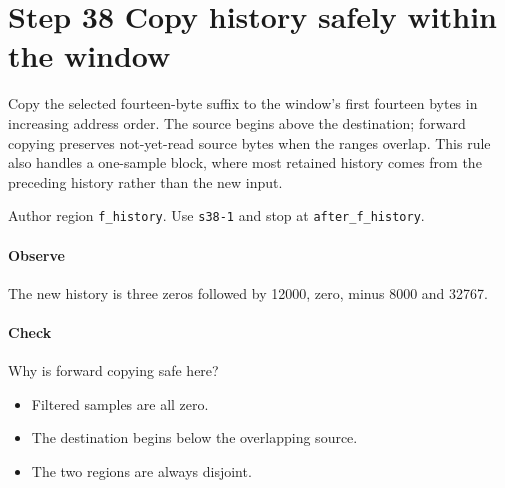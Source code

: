 \section{Step 38 Copy history safely within the window}\label{pcm-wav-s38}
Copy the selected fourteen-byte suffix to the window's first fourteen bytes in increasing address order. The source begins above the destination; forward copying preserves not-yet-read source bytes when the ranges overlap. This rule also handles a one-sample block, where most retained history comes from the preceding history rather than the new input.

Author region \texttt{f\_history}. Use \texttt{s38-1} and stop at \texttt{after\_f\_history}.

\paragraph{Observe} The new history is three zeros followed by 12000, zero, minus 8000 and 32767.

\paragraph{Check} Why is forward copying safe here?
\begin{itemize}
  \item[A.] Filtered samples are all zero.
  \item[B.] The destination begins below the overlapping source.
  \item[C.] The two regions are always disjoint.
\end{itemize}
